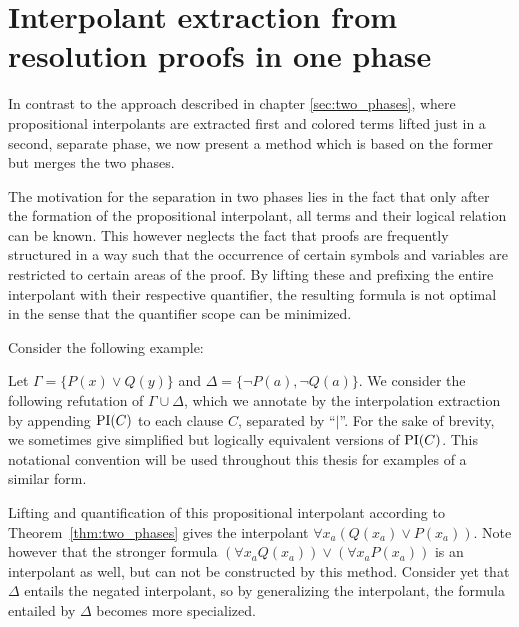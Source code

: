 \chapter{Interpolant extraction from resolution proofs in one phase}
\label{sec:one_phase}
\label{chap:one_phase}

In contrast to the approach described in chapter \ref{sec:two_phases}, where propositional interpolants are extracted first and colored terms lifted just in a second, separate phase, 
we now present a method which is based on the former but merges the two phases.

The motivation for the separation in two phases lies in the fact that only after the formation of the propositional interpolant, all terms and their logical relation can be known.
This however neglects the fact that proofs are frequently structured in a way such that the occurrence of certain symbols and variables are restricted to certain areas of the proof.
By lifting these and prefixing the entire interpolant with their respective quantifier, the resulting formula is not optimal in the sense that the quantifier scope can be minimized.

Consider the following example:

\begin{exa}
	\label{exa:one_phase_motivation}
	Let $\Gamma = \{ P(x) \lor Q(y) \}$ and $\Delta = \{\lnot P(a), \lnot Q(a)\}$.
	We consider the following refutation of $\Gamma \cup \Delta$, which we annotate by the interpolation extraction by appending $\PI(C)$ to each clause $C$, separated by ``$|$''.
	For the sake of brevity, we sometimes give simplified but logically equivalent versions of $\PI(C)$.
	This notational convention will be used throughout this thesis for examples of a similar form.

	\begin{prooftree}
	\end{prooftree}

	Lifting and quantification of this propositional interpolant according to Theorem~\ref{thm:two_phases} gives the interpolant $\forall x_a (Q(x_a) \lor P(x_a))$.
	Note however that the stronger formula $(\forall x_a Q(x_a) ) \lor (\forall x_a P(x_a))$ is an interpolant as well, but can not be constructed by this method.
	Consider yet that $\Delta$ entails the negated interpolant, so by generalizing the interpolant, the formula entailed by $\Delta$ becomes more specialized.
\end{exa}

